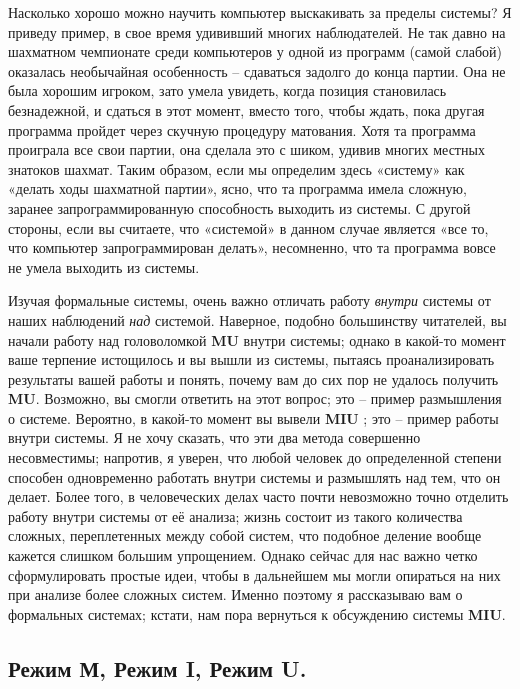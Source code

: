 \documentclass[../main.tex]{subfiles}
\begin{document}
Насколько хорошо можно научить компьютер выскакивать за пределы системы? Я приведу пример, в свое время удививший многих наблюдателей. Не так давно на шахматном чемпионате среди компьютеров у одной из программ (самой слабой) оказалась необычайная особенность \--- сдаваться задолго до конца партии. Она не была хорошим игроком, зато умела увидеть, когда позиция становилась безнадежной, и сдаться в этот момент, вместо того, чтобы ждать, пока другая программа пройдет через скучную процедуру матования. Хотя та программа проиграла все свои партии, она сделала это с шиком, удивив многих местных знатоков шахмат. Таким образом, если мы определим здесь «систему» как «делать ходы шахматной партии», ясно, что та программа имела сложную, заранее запрограммированную способность выходить из системы. С другой стороны, если вы считаете, что «системой» в данном случае является «все то, что компьютер запрограммирован делать», несомненно, что та программа вовсе не умела выходить из системы.

Изучая формальные системы, очень важно отличать работу \emph{внутри} системы от наших наблюдений \emph{над} системой. Наверное, подобно большинству читателей, вы начали работу над головоломкой \textbf{MU} внутри системы; однако в какой-то момент ваше терпение истощилось и вы вышли из системы, пытаясь проанализировать результаты вашей работы и понять, почему вам до сих пор не удалось получить \textbf{MU}. Возможно, вы смогли ответить на этот вопрос; это \--- пример размышления о системе. Вероятно, в какой-то момент вы вывели \textbf{MIU} ; это \--- пример работы внутри системы. Я не хочу сказать, что эти два метода совершенно несовместимы; напротив, я уверен, что любой человек до определенной степени способен одновременно работать внутри системы и размышлять над тем, что он делает. Более того, в человеческих делах часто почти невозможно точно отделить работу внутри системы от её анализа; жизнь состоит из такого количества сложных, переплетенных между собой систем, что подобное деление вообще кажется слишком большим упрощением. Однако сейчас для нас важно четко сформулировать простые идеи, чтобы в дальнейшем мы могли опираться на них при анализе более сложных систем. Именно поэтому я рассказываю вам о формальных системах; кстати, нам пора вернуться к обсуждению системы \textbf{MIU}.


\subsection{Режим М, Режим I, Режим U.}
\end{document}
